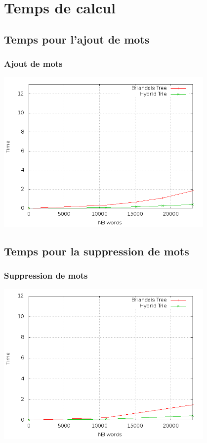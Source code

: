 \documentclass{beamer}
\begin{document}
\section{Temps de calcul}

\subsection{Temps pour l'ajout de mots}
\begin{frame}
  \frametitle{Ajout de mots}
  \begin{center}
    \includegraphics[width=0.8\textwidth]{timeAdd.png}
  \end{center}
\end{frame}

\subsection{Temps pour la suppression de mots}
\begin{frame}
  \frametitle{Suppression de mots}
  \begin{center}
    \includegraphics[width=0.8\textwidth]{timeDel.png}
  \end{center}
\end{frame}
\end{document}
